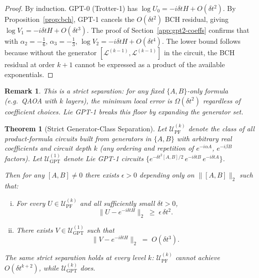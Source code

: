 \documentclass[aps,prxquantum,twocolumn,nofootinbib]{revtex4-2}
\newtheorem{theorem}{Theorem}
\newtheorem{remark}{Remark}
\begin{document}
\begin{proof}
  By induction. GPT-0 (Trotter-1) has $\log U_0 = -i\delta t H + O(\delta t^2)$.
  By Proposition~\ref{prop:bch}, GPT-1 cancels the $O(\delta t^2)$ BCH
  residual, giving $\log V_1 = -i\delta t H + O(\delta t^3)$.
  The proof of Section~\ref{app:gpt2-coeffs} confirms that with
  $\alpha_2=-\tfrac{1}{6}$, $\alpha_3=-\tfrac{1}{3}$,
  $\log V_2 = -i\delta t H + O(\delta t^4)$.
  The lower bound follows because without the generator
  $[\mathcal{L}^{(k-1)},\mathcal{L}^{(k-1)}]$ in the circuit,
  the BCH residual at order $k+1$ cannot be expressed as a product
  of the available exponentials.
\end{proof}

\begin{remark}
  This is a strict separation: for any fixed $\{A,B\}$-only
  formula (e.g.\ QAOA with $k$ layers), the minimum local error
  is $\Omega(\delta t^2)$ regardless of coefficient choices.
  Lie GPT-1 breaks this floor by expanding the generator set.
\end{remark}

\begin{theorem}[Strict Generator-Class Separation]
  \label{thm:separation}
  Let $\mathcal{U}_{\mathrm{PF}}^{(k)}$ denote the class of all
  product-formula circuits built from generators in $\{A,B\}$ with
  arbitrary real coefficients and circuit depth $k$ (any ordering and
  repetition of $e^{-i\alpha A}$, $e^{-i\beta B}$ factors).
  Let $\mathcal{U}_{\mathrm{GPT}}^{(1)}$ denote Lie GPT-1 circuits
  $\{e^{-\delta t^2[A,B]/2}\,e^{-i\delta t B}\,e^{-i\delta t A}\}$.

  Then for any $[A,B]\neq 0$ there exists $\epsilon>0$ depending only
  on $\|[A,B]\|_2$ such that:
  \begin{enumerate}[(i)]
   \item For every $U\in\mathcal{U}_{\mathrm{PF}}^{(k)}$ and all
     sufficiently small $\delta t>0$,
     \begin{equation}
       \|U - e^{-i\delta t H}\|_2 \;\geq\; \epsilon\,\delta t^2.
       \label{eq:sep-lower}
     \end{equation}
   \item There exists $V\in\mathcal{U}_{\mathrm{GPT}}^{(1)}$ such that
     \begin{equation}
       \|V - e^{-i\delta t H}\|_2 \;=\; O(\delta t^3).
       \label{eq:sep-upper}
     \end{equation}
  \end{enumerate}
  The same strict separation holds at every level $k$:
  $\mathcal{U}_{\mathrm{PF}}^{(k)}$ cannot achieve $O(\delta t^{k+2})$,
  while $\mathcal{U}_{\mathrm{GPT}}^{(k)}$ does.
\end{theorem}
\end{document}
